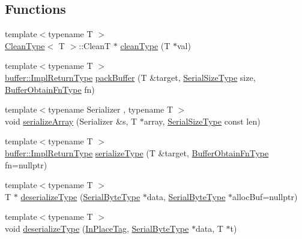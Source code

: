 \subsection*{Functions}
\begin{DoxyCompactItemize}
\item 
{\footnotesize template$<$typename T $>$ }\\\hyperlink{structcheckpoint_1_1dispatch_1_1_clean_type}{Clean\+Type}$<$ T $>$\+::CleanT $\ast$ \hyperlink{namespacecheckpoint_1_1dispatch_ad92e256ab5d87d2a5a97ed6ed011af9c}{clean\+Type} (T $\ast$val)
\item 
{\footnotesize template$<$typename T $>$ }\\\hyperlink{namespacecheckpoint_1_1buffer_a4e930737a23dabd17333a8ea48c8edff}{buffer\+::\+Impl\+Return\+Type} \hyperlink{namespacecheckpoint_1_1dispatch_aca3c0f09e49b43fb6f3d82fe39e89295}{pack\+Buffer} (T \&target, \hyperlink{namespacecheckpoint_a083f6674da3f94c2901b18c6d238217c}{Serial\+Size\+Type} size, \hyperlink{namespacecheckpoint_a8a2558a1dd0db386339dd81c193b7f10}{Buffer\+Obtain\+Fn\+Type} fn)
\item 
{\footnotesize template$<$typename Serializer , typename T $>$ }\\void \hyperlink{namespacecheckpoint_1_1dispatch_a055fa8c0078dbd129325b1038079d87d}{serialize\+Array} (Serializer \&s, T $\ast$array, \hyperlink{namespacecheckpoint_a083f6674da3f94c2901b18c6d238217c}{Serial\+Size\+Type} const len)
\item 
{\footnotesize template$<$typename T $>$ }\\\hyperlink{namespacecheckpoint_1_1buffer_a4e930737a23dabd17333a8ea48c8edff}{buffer\+::\+Impl\+Return\+Type} \hyperlink{namespacecheckpoint_1_1dispatch_a721d20cfc6479ca5e029671a56915adc}{serialize\+Type} (T \&target, \hyperlink{namespacecheckpoint_a8a2558a1dd0db386339dd81c193b7f10}{Buffer\+Obtain\+Fn\+Type} fn=nullptr)
\item 
{\footnotesize template$<$typename T $>$ }\\T $\ast$ \hyperlink{namespacecheckpoint_1_1dispatch_aa6898b55f6fb0de0b628567087cc8755}{deserialize\+Type} (\hyperlink{namespacecheckpoint_ae57f01cdc0b81776c23b6c7c934c58f5}{Serial\+Byte\+Type} $\ast$data, \hyperlink{namespacecheckpoint_ae57f01cdc0b81776c23b6c7c934c58f5}{Serial\+Byte\+Type} $\ast$alloc\+Buf=nullptr)
\item 
{\footnotesize template$<$typename T $>$ }\\void \hyperlink{namespacecheckpoint_1_1dispatch_a1830f5dccc7209dc2bbb3b7ac238c36a}{deserialize\+Type} (\hyperlink{structcheckpoint_1_1dispatch_1_1_in_place_tag}{In\+Place\+Tag}, \hyperlink{namespacecheckpoint_ae57f01cdc0b81776c23b6c7c934c58f5}{Serial\+Byte\+Type} $\ast$data, T $\ast$t)

\end{DoxyCompactItemize}
